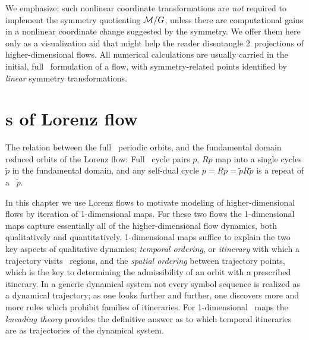 We emphasize: such nonlinear coordinate transformations are
\emph{not} required to implement the symmetry quotienting
${\cal M}/G$, unless there are computational gains in a nonlinear
coordinate change suggested by the symmetry. We offer them here
only as a visualization aid that might help the reader
disentangle 2\dmn\ projections of higher-dimensional flows. All
numerical calculations are usually carried in the initial, full
\statesp\ formulation of a flow, with symmetry-related points
identified by \emph{linear} symmetry transformations.


\section{\Rpo s of Lorenz flow}\label{exmp:LorenzRpos}
%
The relation between the full \statesp\ periodic orbits,
and the fundamental domain  reduced orbits
of the Lorenz flow:
Full \statesp\ cycle pairs $p$, $Rp$ map into
a single cycles $\tilde{p}$ in the fundamental domain, and any
self-dual cycle $p = Rp = \tilde{p}R\tilde{p}$
is a repeat of a \rpo\ $\tilde{p}$.



In this chapter we use Lorenz flows to motivate modeling of
higher-dimensional flows by iteration of 1-dimensional maps.
For these two flows the 1-dimensional maps capture essentially
all of the higher-dimensional flow dynamics, both qualitatively
and quantitatively. 1-dimensional maps suffice to explain the
two key aspects of qualitative dynamics; \emph{temporal
ordering}, or \emph{itinerary} with which a trajectory visits
\statesp\ regions, and the \emph{spatial ordering} between
trajectory points, which is the key to determining the
admissibility of an orbit with a prescribed itinerary. In a
generic dynamical system not every symbol sequence is realized
as a dynamical trajectory; as one looks further and further,
one discovers more and more rules which prohibit families of
itineraries. For 1-dimensional \stretchf\ maps the
\emph{kneading theory} provides the definitive answer as to
which temporal itineraries are {\em \admissible} as
trajectories of the dynamical system.



